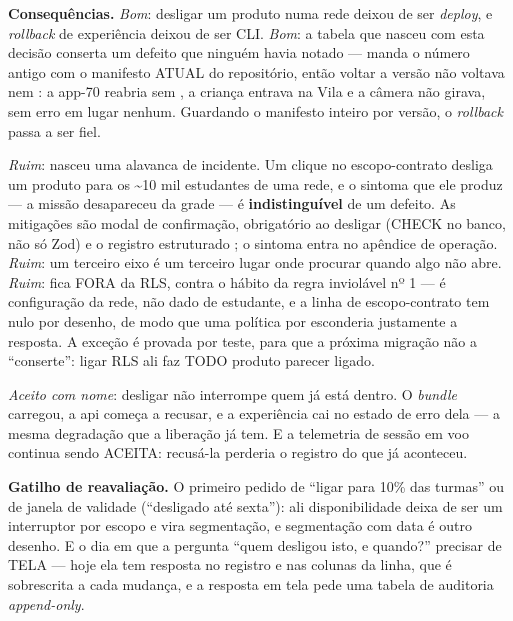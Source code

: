 \textbf{Consequências.} \emph{Bom}: desligar um produto numa rede deixou de ser
\emph{deploy}, e \emph{rollback} de experiência deixou de ser CLI. \emph{Bom}: a
tabela  que nasceu com esta decisão conserta um defeito
que ninguém havia notado ---  manda o
número antigo com o manifesto ATUAL do repositório, então voltar a versão não
voltava  nem : a app-70 reabria sem
, a criança entrava na Vila e a câmera não girava, sem
erro em lugar nenhum. Guardando o manifesto inteiro por versão, o
\emph{rollback} passa a ser fiel.

\emph{Ruim}: nasceu uma alavanca de incidente. Um clique no escopo-contrato
desliga um produto para os \textasciitilde10 mil estudantes de uma rede, e o
sintoma que ele produz --- a missão desapareceu da grade --- é
\textbf{indistinguível} de um defeito. As mitigações são modal de confirmação,
 obrigatório ao desligar (CHECK no banco, não só Zod) e o registro
estruturado ; o sintoma entra no apêndice de operação.
\emph{Ruim}: um terceiro eixo é um terceiro lugar onde procurar quando algo não
abre. \emph{Ruim}:  fica FORA da RLS, contra o hábito da
regra inviolável nº 1 --- é configuração da rede, não dado de estudante, e a
linha de escopo-contrato tem  nulo por desenho, de modo que uma
política por  esconderia justamente a resposta. A exceção é
provada por teste, para que a próxima migração não a \enquote{conserte}: ligar
RLS ali faz TODO produto parecer ligado.

\emph{Aceito com nome}: desligar não interrompe quem já está dentro. O
\emph{bundle} carregou, a api começa a recusar, e a experiência cai no estado de
erro dela --- a mesma degradação que a liberação  já tem. E a
telemetria de sessão em voo continua sendo ACEITA: recusá-la perderia o registro
do que já aconteceu.

\textbf{Gatilho de reavaliação.} O primeiro pedido de \enquote{ligar para 10\%
das turmas} ou de janela de validade (\enquote{desligado até sexta}): ali
disponibilidade deixa de ser um interruptor por escopo e vira segmentação, e
segmentação com data é outro desenho. E o dia em que a pergunta \enquote{quem
desligou isto, e quando?} precisar de TELA --- hoje ela tem resposta no registro
e nas colunas da linha, que é sobrescrita a cada mudança, e a resposta em tela
pede uma tabela de auditoria \emph{append-only}.


